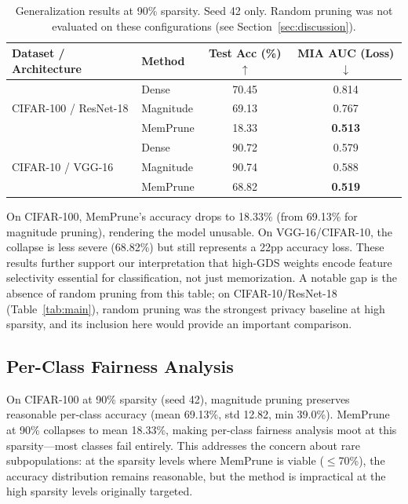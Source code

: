 \documentclass{article}
\begin{document}
\begin{table}[t]
\caption{Generalization results at 90\% sparsity. Seed 42 only. Random pruning was not evaluated on these configurations (see Section~\ref{sec:discussion}).}
\label{tab:generalization}
\centering
\begin{tabular}{llcc}
\toprule
Dataset / Architecture & Method & Test Acc (\%) $\uparrow$ & MIA AUC (Loss) $\downarrow$ \\
\midrule
\multirow{3}{*}{CIFAR-100 / ResNet-18} & Dense & 70.45 & 0.814 \\
& Magnitude & 69.13 & 0.767 \\
& MemPrune & 18.33 & \textbf{0.513} \\
\midrule
\multirow{3}{*}{CIFAR-10 / VGG-16} & Dense & 90.72 & 0.579 \\
& Magnitude & 90.74 & 0.588 \\
& MemPrune & 68.82 & \textbf{0.519} \\
\bottomrule
\end{tabular}
\end{table}

On CIFAR-100, MemPrune's accuracy drops to 18.33\% (from 69.13\% for magnitude pruning), rendering the model unusable. On VGG-16/CIFAR-10, the collapse is less severe (68.82\%) but still represents a 22pp accuracy loss. These results further support our interpretation that high-GDS weights encode feature selectivity essential for classification, not just memorization. A notable gap is the absence of random pruning from this table; on CIFAR-10/ResNet-18 (Table~\ref{tab:main}), random pruning was the strongest privacy baseline at high sparsity, and its inclusion here would provide an important comparison.

\subsection{Per-Class Fairness Analysis}

On CIFAR-100 at 90\% sparsity (seed 42), magnitude pruning preserves reasonable per-class accuracy (mean 69.13\%, std 12.82, min 39.0\%). MemPrune at 90\% collapses to mean 18.33\%, making per-class fairness analysis moot at this sparsity---most classes fail entirely. This addresses the \citet{feldman2020does} concern about rare subpopulations: at the sparsity levels where MemPrune is viable ($\leq$70\%), the accuracy distribution remains reasonable, but the method is impractical at the high sparsity levels originally targeted.
\end{document}
